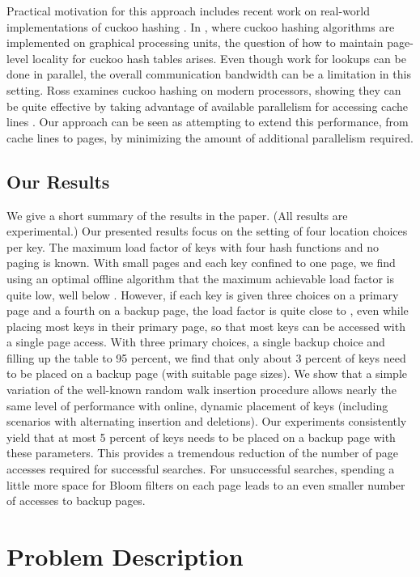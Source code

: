 \let\accentvec\vec \documentclass{llncs}
\begin{document}
Practical motivation for this approach includes recent work on
real-world implementations of cuckoo hashing \cite{alcantara2009real,ross2007efficient}.
In \cite{alcantara2009real}, where cuckoo
hashing algorithms are implemented on graphical processing units, the
question of how to maintain page-level locality for cuckoo hash tables
arises.  Even though work for lookups can be done in parallel, the
overall communication bandwidth can be a limitation in this setting.
Ross examines cuckoo hashing on modern processors, showing they
can be quite effective by taking advantage of available parallelism
for accessing cache lines \cite{ross2007efficient}.  Our approach 
can be seen as attempting to extend this performance, from cache lines
to pages, by minimizing the amount of additional parallelism required.
\subsection{Our Results}
We give a short summary of the results in the paper. (All results are
experimental.)  Our presented results focus on the setting of four
location choices per key.  The maximum load factor  of keys
with four hash functions and no paging is known.  With small pages and
each key confined to one page, we find using an optimal offline
algorithm that the maximum achievable load factor is quite low, well
below .  However, if each key is given three choices on a
primary page and a fourth on a backup page, the load factor is quite
close to , even while
placing most keys in their primary page, so that most keys can be
accessed with a single page access.  With three primary choices, a
single backup choice and filling up the table to 95 percent,
we find that only about 3 percent of keys need
to be placed on a backup page (with suitable page sizes).  We show
that a simple variation of the well-known random walk insertion
procedure allows nearly the same level of performance with online,
dynamic placement of keys (including scenarios with alternating insertion and deletions).
Our experiments consistently yield that at
most 5 percent of keys needs to be placed on a backup page with these
parameters. This provides a tremendous reduction of the number of
page accesses required for successful searches. 
For unsuccessful searches, spending a little more space for
Bloom filters on each page leads to an even smaller number of accesses to backup pages.

\section{Problem Description}
\end{document}
